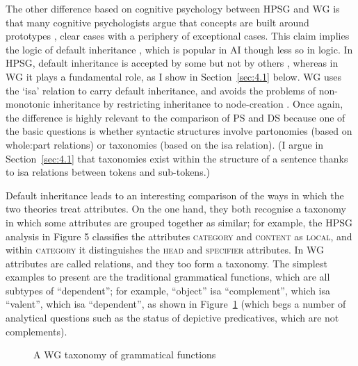 \documentclass[output=paper]{langscibook}
\begin{document}
The other difference based on cognitive psychology between HPSG and WG is that many cognitive psychologists argue that concepts are built around prototypes \citep{Rosch1973,Taylor1995}, clear cases with a periphery of exceptional cases. This claim implies the logic of default inheritance \citep{BCdP93a-ed}, which is popular in AI though less so in logic. In HPSG, default inheritance is accepted by some \citep{LC99a} but not by others \citep[403]{MuellerGT-Eng2}, whereas in WG it plays a fundamental role, as I show in Section~\ref{sec:4.1} below. WG uses the ‘isa’ relation to carry default inheritance, and avoids the problems of non-monotonic inheritance by restricting inheritance to node-creation \cite[18]{Hudson2017a}. Once again, the difference is highly relevant to the comparison of PS and DS because one of the basic questions is whether syntactic structures involve partonomies (based on whole:part relations) or taxonomies (based on the isa relation). (I argue in Section~\ref{sec:4.1} that taxonomies exist within the structure of a sentence thanks to isa relations between tokens and sub-tokens.)

Default inheritance leads to an interesting comparison of the ways in which the two theories treat attributes. On the one hand, they both recognise a taxonomy in which some attributes are grouped together as similar; for example, the HPSG analysis in Figure 5 classifies the attributes \textsc{category} and \textsc{content} as \textsc{local}, and within \textsc{category} it distinguishes the \textsc{head} and \textsc{specifier} attributes. In WG attributes are called relations, and they too form a taxonomy. The simplest examples to present are the traditional grammatical functions, which are all subtypes of ``dependent''; for example, ``object'' isa ``complement'', which isa ``valent'', which isa ``dependent'', as shown in Figure~\ref{fig:8} (which begs a number of analytical questions such as the status of depictive predicatives, which are not complements).

\begin{figure}
	\centering
{}
	\caption{A WG taxonomy of grammatical functions}
	\label{fig:8}
\end{figure}
\end{document}
